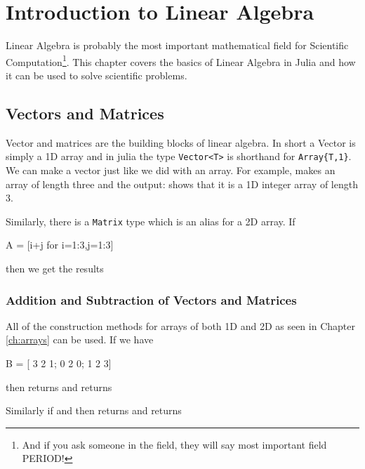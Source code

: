 
\chapter{Introduction to Linear Algebra} \label{ch:lin-alg-intro}

Linear Algebra is probably the most important mathematical field for Scientific Computation\footnote{And if you ask someone in the field, they will say most important field PERIOD!}.  This chapter covers the basics of Linear Algebra in Julia and how it can be used to solve scientific problems. 

\section{Vectors and Matrices}

Vector and matrices are the building blocks of linear algebra.  In short a Vector is simply a 1D array and in julia the type \verb!Vector<T>! is shorthand for \verb!Array{T,1}!.  We can make a vector just like we did with an array.  For example,  makes an array of length three and the output:  \printpythontex[verbatim]
%
shows that it is a 1D integer array of length 3. 
 
 Similarly, there is a \verb!Matrix! type which is an alias for a 2D array.  If 
 \begin{jlblock}[la]
 A = [i+j for i=1:3,j=1:3]
 \end{jlblock}
 then we get the results  \printpythontex[verbatim]

\subsection{Addition and Subtraction of Vectors and Matrices}

All of the construction methods for arrays of both 1D and 2D as seen in Chapter \ref{ch:arrays} can be used.   If we have 
\begin{jlblock}[la]
B = [ 3 2 1; 0 2 0; 1 2 3]
\end{jlblock}
then  returns  \printpythontex[verbatim] and  returns  \printpythontex[verbatim]

Similarly if  and  then  returns  \printpythontex[verbatim] and  returns  \printpythontex[verbatim]

